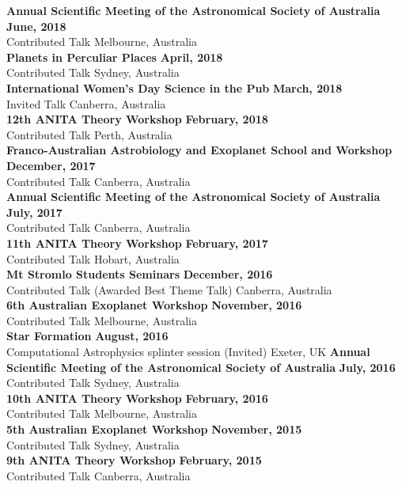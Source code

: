 \documentclass[margin,line]{res}
\begin{document}
\begin{resume}
		{\bf Annual Scientific Meeting of the Astronomical Society of Australia} \hfill {\bf June, 2018}\\
		Contributed Talk \hfill Melbourne, Australia\\
		{\bf Planets in Perculiar Places} \hfill {\bf April, 2018}\\
		Contributed Talk \hfill Sydney, Australia\\
		{\bf International Women's Day Science in the Pub} \hfill {\bf March, 2018}\\
		Invited Talk \hfill Canberra, Australia\\
		{\bf 12th ANITA Theory Workshop} \hfill {\bf February, 2018}\\
		Contributed Talk \hfill Perth, Australia\\
		{\bf Franco-Australian Astrobiology and Exoplanet School and Workshop} \hfill {\bf December, 2017}\\
		Contributed Talk \hfill Canberra, Australia\\
		{\bf Annual Scientific Meeting of the Astronomical Society of Australia} \hfill {\bf July, 2017}\\
		Contributed Talk \hfill Canberra, Australia\\
		{\bf 11th ANITA Theory Workshop} \hfill {\bf February, 2017}\\
		Contributed Talk \hfill Hobart, Australia\\
		{\bf Mt Stromlo Students Seminars} \hfill {\bf December, 2016}\\
		Contributed Talk (Awarded Best Theme Talk) \hfill Canberra, Australia\\
		{\bf 6th Australian Exoplanet Workshop} \hfill {\bf November, 2016}\\
		Contributed Talk \hfill Melbourne, Australia\\
		{\bf Star Formation} \hfill {\bf August, 2016}\\
		Computational Astrophysics splinter session (Invited) \hfill Exeter, UK
		{\bf Annual Scientific Meeting of the Astronomical Society of Australia} \hfill {\bf July, 2016}\\
		Contributed Talk \hfill Sydney, Australia\\
		{\bf 10th ANITA Theory Workshop} \hfill {\bf February, 2016}\\
		Contributed Talk \hfill Melbourne, Australia\\
		{\bf 5th Australian Exoplanet Workshop} \hfill {\bf November, 2015}\\
		Contributed Talk \hfill Sydney, Australia\\
		{\bf 9th ANITA Theory Workshop} \hfill {\bf February, 2015}\\
		Contributed Talk \hfill Canberra, Australia\\
		

\end{resume}
\end{document}
